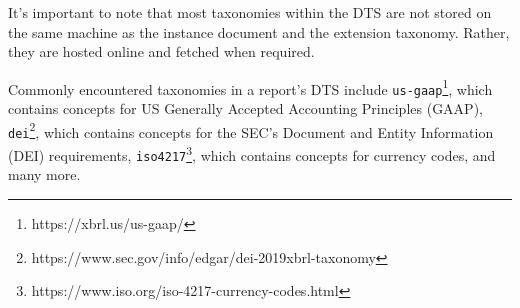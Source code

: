 
It's important to note that most taxonomies within the DTS are not stored on the same machine as the instance document and the extension taxonomy.
Rather, they are hosted online and fetched when required.

Commonly encountered taxonomies in a report's DTS include 
\texttt{us-gaap}\footnote{https://xbrl.us/us-gaap/}, which contains concepts for US Generally Accepted Accounting Principles (GAAP),
\texttt{dei}\footnote{https://www.sec.gov/info/edgar/dei-2019xbrl-taxonomy}, which contains concepts for the SEC's Document and Entity Information (DEI) requirements,
\texttt{iso4217}\footnote{https://www.iso.org/iso-4217-currency-codes.html}, which contains concepts for currency codes, 
and many more.





